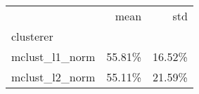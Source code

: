 \begin{tabular}{lrr}
\toprule
{} &   mean &    std \\
clusterer      &        &        \\
\midrule
mclust\_l1\_norm & 55.81\% & 16.52\% \\
mclust\_l2\_norm & 55.11\% & 21.59\% \\
\bottomrule
\end{tabular}

